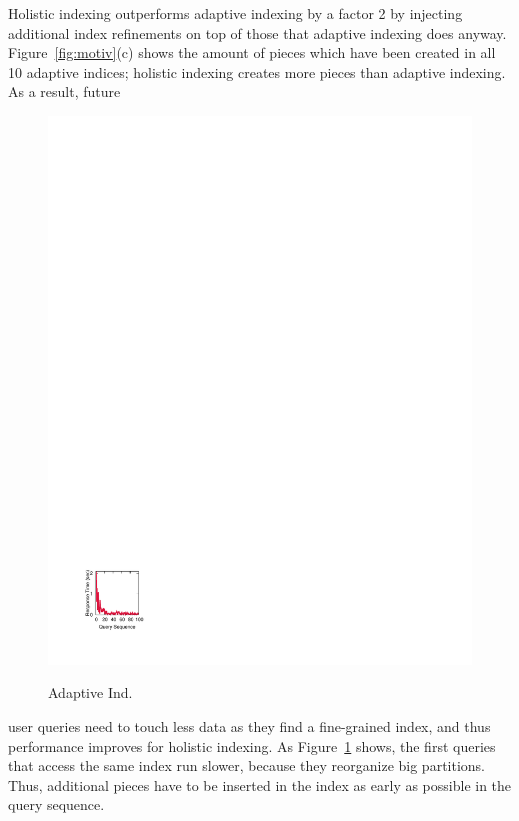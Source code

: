 Holistic indexing outperforms adaptive indexing by a factor 2 by injecting additional index refinements on top of those that adaptive indexing does anyway.
Figure~\ref{fig:motiv}(c) shows the amount of pieces which have been created in all 10 adaptive indices; holistic 
indexing creates more pieces than adaptive indexing. 
As a result, 
future
\begin{figure}
\begin{center}
\includegraphics[trim=2.9cm 2cm 18.5cm 23.7cm]{Figures/holistic/cost_graph}
\vspace{-0.1in}   %
\caption{\small{Adaptive Ind.}}
\vspace{-0.7cm}
\label{fig:cost_graph}
\end{center}
\end{figure}
 user queries need to touch less data as they find a fine-grained index, and thus performance improves for holistic indexing. As Figure~\ref{fig:cost_graph}
 shows, the first queries that access the same index run slower, because they reorganize big partitions. Thus, additional
pieces have to be inserted in the index as early as possible in the query sequence.


